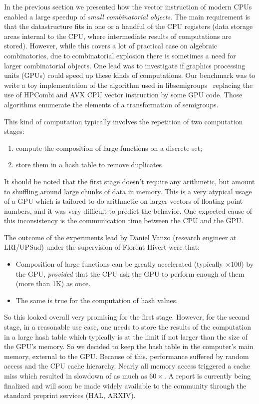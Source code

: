\documentclass{deliverablereport}
\begin{document}
In the previous section we presented how the vector instruction of modern
CPUs enabled a large speedup of \emph{small combinatorial
  objects}. The main requirement is that the datastructure fits in one or a
handful of the CPU registers (data storage areas internal to the CPU, where
intermediate results of computations are stored). However, while this
covers a lot of practical case on algebraic combinatorics, due to combinatorial
explosion there is sometimes a
need for larger combinatorial objects. One lead was to investigate if graphics
processing units (GPUs) could speed up these kinds of computations. Our benchmark was to write a
toy implementation of the algorithm used in libsemigroups~\cite{libsemigroups}
replacing the use of HPCombi and AVX CPU vector instruction by some GPU
code. Those algorithms enumerate the elements of a transformation of semigroups.

This kind of computation typically involves the repetition of two computation
stages:
\begin{enumerate}
\item compute the composition of large functions on a discrete set;
\item store them in a hash table to remove duplicates.
\end{enumerate}
It should be noted that the first stage doesn't require any arithmetic, but
amount to shuffling around large chunks of data in memory. This is a very atypical usage of a
GPU which is tailored to do arithmetic on larger vectors of floating point numbers, and it was very difficult
to predict the behavior. One expected cause of this inconsistency is the communication time
between the CPU and the GPU.
\medskip

The outcome of the experiments lead by Daniel Vanzo (research engineer at
LRI/UPSud) under the supervision of Florent Hivert were that:
\begin{itemize}
\item Composition of large functions can be greatly accelerated (typically
$\times 100$) by the GPU, \emph{provided} that the CPU ask the GPU to perform
enough of them (more than 1K) as once.
\item The same is true for the computation of hash values.
\end{itemize}
So this looked overall very promising for the first stage. However, for the
second stage, in a reasonable use case, one needs to store the results of the
computation in a large hash table which typically is at the limit if not
larger than the size of the GPU's memory. So we decided to keep the hash table
in the computer's main memory, external to the GPU. Because of this,
performance suffered by random access and the CPU cache hierarchy. Nearly all
memory access triggered a cache miss which resulted in slowdown of as much as
$60\times$. A report is currently being finalized and will soon be made widely
available to the community through the standard preprint services (HAL,
ARXIV).  \bigskip
\end{document}
